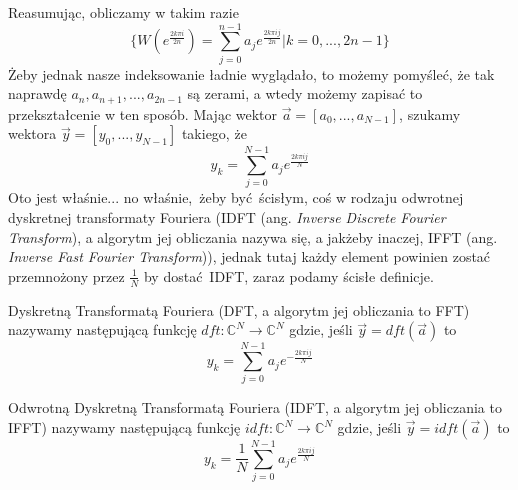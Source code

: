 Reasumując, obliczamy w takim razie $$\{W(e^{\frac{2k\pi i}{2n}}) = \sum_{j=0}^{n-1}a_je^{\frac{2k\pi ij}{2n}} | k = 0,...,2n-1\}$$
Żeby jednak nasze indeksowanie ładnie wyglądało, to możemy pomyśleć, że tak naprawdę $a_n, a_{n+1}, ..., a_{2n-1}$ są zerami, a wtedy możemy zapisać to przekształcenie w ten sposób.
Mając wektor $\vec{a} = [a_0, ..., a_{N-1}]$, szukamy wektora $\vec{y} = [y_0, ..., y_{N-1}]$ takiego, że
$$y_k = \sum_{j=0}^{N-1}a_je^{\frac{2k\pi ij}{N}}$$ Oto jest właśnie... no właśnie, żeby być ścisłym, coś w rodzaju odwrotnej dyskretnej transformaty Fouriera (IDFT (ang. \textit{Inverse Discrete Fourier Transform}),
a algorytm jej obliczania nazywa się, a jakżeby inaczej, IFFT (ang. \textit{Inverse Fast Fourier Transform})),
jednak tutaj każdy element powinien zostać przemnożony przez $\frac{1}{N}$ by dostać IDFT, zaraz podamy ścisłe definicje.
\begin{definition}
    Dyskretną Transformatą Fouriera (DFT, a algorytm jej obliczania to FFT) nazywamy następującą funkcję $dft: \mathbb{C}^N \rightarrow \mathbb{C}^N$
    gdzie, jeśli $\vec{y} = dft(\vec{a})$ to $$y_k = \sum_{j=0}^{N-1}a_je^{-\frac{2k\pi ij}{N}}$$
\end{definition}

\begin{definition}
    Odwrotną Dyskretną Transformatą Fouriera (IDFT, a algorytm jej obliczania to IFFT) nazywamy następującą funkcję $idft: \mathbb{C}^N \rightarrow \mathbb{C}^N$
    gdzie, jeśli $\vec{y} = idft(\vec{a})$ to $$y_k = \frac{1}{N}\sum_{j=0}^{N-1}a_je^{\frac{2k\pi ij}{N}}$$
\end{definition}

